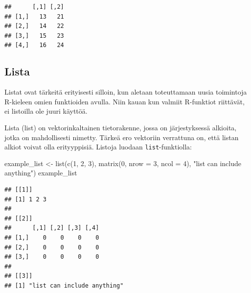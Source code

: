 \documentclass[
]{book}
\newenvironment{Shaded}{\begin{snugshade}}{\end{snugshade}}
\newcommand{\AttributeTok}[1]{\textcolor[rgb]{0.77,0.63,0.00}{#1}}
\newcommand{\DecValTok}[1]{\textcolor[rgb]{0.00,0.00,0.81}{#1}}
\newcommand{\FunctionTok}[1]{\textcolor[rgb]{0.00,0.00,0.00}{#1}}
\newcommand{\NormalTok}[1]{#1}
\newcommand{\OtherTok}[1]{\textcolor[rgb]{0.56,0.35,0.01}{#1}}
\newcommand{\StringTok}[1]{\textcolor[rgb]{0.31,0.60,0.02}{#1}}
\begin{document}
\begin{verbatim}
##      [,1] [,2]
## [1,]   13   21
## [2,]   14   22
## [3,]   15   23
## [4,]   16   24
\end{verbatim}

\hypertarget{list}{%
\subsection{Lista}\label{list}}

Listat ovat tärkeitä erityisesti silloin, kun aletaan toteuttamaan uusia toimintoja R-kieleen omien funktioiden avulla. Niin kauan kun valmiit R-funktiot riittävät, ei listoilla ole juuri käyttöä.

Lista (list) on vektorinkaltainen tietorakenne, jossa on järjestyksessä alkioita, jotka on mahdollisesti nimetty. Tärkeä ero vektoriin verrattuna on, että listan alkiot voivat olla erityyppisiä. Listoja luodaan \texttt{list}-funktiolla:

\begin{Shaded}
\begin{Highlighting}[]
\NormalTok{example\_list }\OtherTok{\textless{}{-}} \FunctionTok{list}\NormalTok{(}\FunctionTok{c}\NormalTok{(}\DecValTok{1}\NormalTok{, }\DecValTok{2}\NormalTok{, }\DecValTok{3}\NormalTok{),}
                     \FunctionTok{matrix}\NormalTok{(}\DecValTok{0}\NormalTok{, }\AttributeTok{nrow =} \DecValTok{3}\NormalTok{, }\AttributeTok{ncol =} \DecValTok{4}\NormalTok{),}
                     \StringTok{"list can include anything"}\NormalTok{)}
\NormalTok{example\_list}
\end{Highlighting}
\end{Shaded}

\begin{verbatim}
## [[1]]
## [1] 1 2 3
## 
## [[2]]
##      [,1] [,2] [,3] [,4]
## [1,]    0    0    0    0
## [2,]    0    0    0    0
## [3,]    0    0    0    0
## 
## [[3]]
## [1] "list can include anything"
\end{verbatim}
\end{document}
